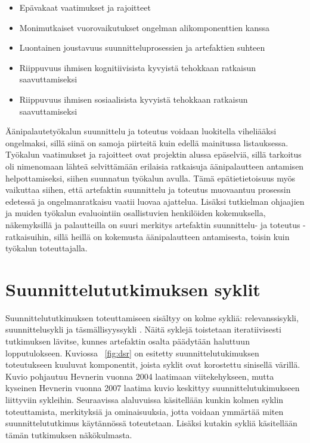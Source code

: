 \documentclass[utf8]{gradu3}
\begin{document}
\begin{itemize}
  \item Epävakaat vaatimukset ja rajoitteet
  \item Monimutkaiset vuorovaikutukset ongelman alikomponenttien kanssa
  \item Luontainen joustavuus suunnitteluprosessien ja artefaktien suhteen
  \item Riippuvuus ihmisen kognitiivisista kyvyistä tehokkaan ratkaisun saavuttamiseksi
  \item Riippuvuus ihmisen sosiaalisista kyvyistä tehokkaan ratkaisun saavuttamiseksi
\end{itemize}

Äänipalautetyökalun suunnittelu ja toteutus voidaan luokitella viheliääksi ongelmaksi, sillä siinä on samoja piirteitä kuin edellä mainitussa listauksessa. Työkalun vaatimukset ja rajoitteet ovat projektin alussa epäselviä, sillä tarkoitus oli nimenomaan lähteä selvittämään erilaisia ratkaisuja äänipalautteen antamisen helpottamiseksi, siihen suunnatun työkalun avulla. Tämä epätietietoisuus myös vaikuttaa siihen, että artefaktin suunnittelu ja toteutus muovaantuu prosessin edetessä ja ongelmanratkaisu vaatii luovaa ajattelua. Lisäksi tutkielman ohjaajien ja muiden työkalun evaluointiin osallistuvien henkilöiden kokemuksella, näkemyksillä ja palautteilla on suuri merkitys artefaktin suunnittelu- ja toteutus -ratkaisuihin, sillä heillä on kokemusta äänipalautteen antamisesta, toisin kuin työkalun toteuttajalla.

%

\section{Suunnittelututkimuksen syklit}

Suunnittelututkimuksen toteuttamiseen sisältyy on kolme sykliä: relevanssisykli, suunnittelusykli ja täsmällisyyssykli \parencite[][]{cycles}. Näitä syklejä toistetaan iteratiivisesti tutkimuksen lävitse, kunnes artefaktin osalta päädytään haluttuun lopputulokseen. Kuviossa ~\ref{fig:dsr} on esitetty suunnittelutukimuksen toteutukseen kuuluvat komponentit, joista syklit ovat korostettu sinisellä värillä. Kuvio pohjautuu Hevnerin vuonna 2004 \parencite[][]{hevner2004} laatimaan viitekehykseen, mutta kyseinen Hevnerin vuonna 2007 \parencite[][]{cycles} laatima kuvio keskittyy suunnittelutukimukseen liittyviin sykleihin. Seuraavissa alaluvuissa käsitellään kunkin kolmen syklin toteuttamista, merkityksiä ja ominaisuuksia, jotta voidaan ymmärtää miten suunnittelututkimus käytännössä toteutetaan. Lisäksi kutakin sykliä käsitellään tämän tutkimuksen näkökulmasta.
\end{document}
